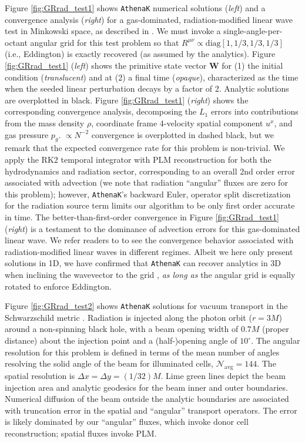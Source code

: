 \documentclass[twocolumn, floatfix]{aastex63}
\newcommand{\ak}{\texttt{AthenaK}}
\begin{document}
Figure \ref{fig:GRrad_test1} shows \ak{} numerical solutions (\textit{left}) and a convergence analysis (\textit{right}) for a gas-dominated, radiation-modified linear wave test in Minkowski space, as described in \cite{2023ApJ...949..103W}.  We must invoke a single-angle-per-octant angular grid for this test problem so that $R^{\mu \nu} \propto \mathrm{diag} \left[ 1, 1/3, 1/3, 1/3 \right]$ (i.e., Eddington) is exactly recovered (as assumed by the analytics).  Figure \ref{fig:GRrad_test1} (\textit{left}) shows the primitive state vector $\mathbf{W}$ for (1) the initial condition (\textit{translucent}) and at (2) a final time (\textit{opaque}), characterized as the time when the seeded linear perturbation decays by a factor of 2.  Analytic solutions are overplotted in black.  Figure \ref{fig:GRrad_test1} (\textit{right}) shows the corresponding convergence analysis, decomposing the $L_1$ errors into contributions from the mass density $\rho$, coordinate frame 4-velocity spatial component $u^x$, and gas pressure $p_g$.  $\propto N^{-2}$ convergence is overplotted in dashed black, but we remark that the expected convergence rate for this problem is non-trivial.  We apply the RK2 temporal integrator with PLM reconstruction for both the hydrodynamics and radiation sector, corresponding to an overall 2nd order error associated with advection (we note that radiation ``angular'' fluxes are zero for this problem); however, \ak{}'s backward Euler, operator split discretization for the radiation source term limits our algorithm to be only first order accurate in time.  The better-than-first-order convergence in Figure \ref{fig:GRrad_test1} (\textit{right}) is a testament to the dominance of advection errors for this gas-dominated linear wave.   We refer readers to \cite{2023ApJ...949..103W} to see the convergence behavior associated with radiation-modified linear waves in different regimes.  Albeit we here only present solutions in 1D, we have confirmed that \ak{} can recover analytics in 3D when inclining the wavevector to the grid \citep[akin to][]{gs08}, \textit{as long as} the angular grid is equally rotated to enforce Eddington.  

Figure \ref{fig:GRrad_test2} shows \ak{} solutions for vacuum transport in the Schwarzschild metric \citep[c.f.,][]{2013MNRAS.429.3533S, 2020ApJ...900...71A, 2020ApJ...901...96A, 2023ApJ...949..103W}.  Radiation is injected along the photon orbit ($r = 3M$) around a non-spinning black hole, with a beam opening width of $0.7M$ (proper distance) about the injection point and a (half-)opening angle of $10^\circ$.  The angular resolution for this problem is defined in terms of the mean number of angles resolving the solid angle of the beam for illuminated cells, $\mathcal{N}_\mathrm{avg} = 144$.  The spatial resolution is $\Delta x = \Delta y = (1 / 32)M$.  Lime green lines depict the beam injection area and analytic geodesics for the beam inner and outer boundaries.  Numerical diffusion of the beam outside the analytic boundaries are associated with truncation error in the spatial and ``angular'' transport operators. The error is likely dominated by our ``angular'' fluxes, which invoke donor cell reconstruction; spatial fluxes invoke PLM. 
\end{document}
